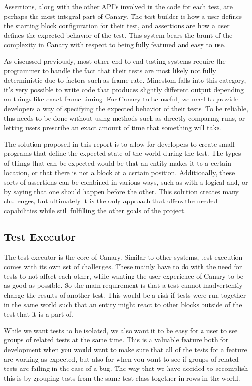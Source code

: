 \documentclass{article}
\begin{document}
\begin{doublespacing}
Assertions, along with the other API’s involved in the code for each test, are perhaps the most integral part of Canary. The test builder is how a user defines the starting block configuration for their test, and assertions are how a user defines the expected behavior of the test. This system bears the brunt of the complexity in Canary with respect to being fully featured and easy to use. 

As discussed previously, most other end to end testing systems require the programmer to handle the fact that their tests are most likely not fully deterministic due to factors such as frame rate. Minestom falls into this category, it’s very possible to write code that produces slightly different output depending on things like exact frame timing. For Canary to be useful, we need to provide developers a way of specifying the expected behavior of their tests. To be reliable, this needs to be done without using methods such as directly comparing runs, or letting users prescribe an exact amount of time that something will take.

The solution proposed in this report is to allow for developers to create small programs that define the expected state of the world during the test. The types of things that can be expected would be that an entity makes it to a certain location, or that there is not a block at a certain position. Additionally, these sorts of assertions can be combined in various ways, such as with a logical and, or by saying that one should happen before the other. This solution creates many challenges, but ultimately it is the only approach that offers the needed capabilities while still fulfilling the other goals of the project.  
\subsection{Test Executor}
The test executor is the core of Canary. Similar to other systems, test execution comes with its own set of challenges. These mainly have to do with the need for tests to not affect each other, while wanting the user experience of Canary to be as good as possible. So the main requirement is that a test cannot inadvertently change the results of another test. This would be a risk if tests were run together in the same world such that an entity might react to other blocks outside of the test that it is a part of.

While we want tests to be isolated, we also want it to be easy for a user to see groups of related tests at the same time. This is a valuable feature both for development when you would want to make sure that all of the tests for a feature are working as expected, but also for when you want to see if groups of related tests are failing in the case of a bug. The way that we have decided to accomplish this is by grouping tests from the same test class together in rows in the world.


\end{doublespacing}
\end{document}
